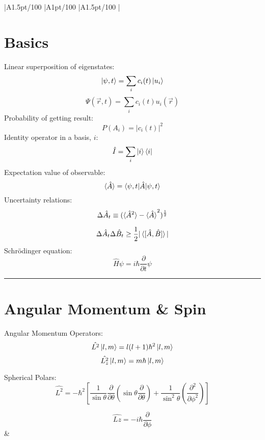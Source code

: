 \documentclass[table,cmyk]{article}
\makeatletter
\newcommand\ratio[2]{\strip@pt\dimexpr#1pt/#2\relax}
\makeatother
\begin{document}
\begin{longtable}
{
    |A{1.5}{\ratio{30}{100}}%
    |A{1}{\ratio{30}{100}}%
    |A{1.5}{\ratio{30}{100}}%
    |%
}\hline
\section*{Basics}
Linear superposition of eigenstates:
\[
\ket{\psi,t} = \sum_{i} c_i(t)\ket{u_i}
\]
\[
\Psi(\vec{r},t) = \sum_{i} c_i(t)u_i(\vec{r})
\]
Probability of getting result:
\[
P(A_i) = |c_i(t)|^2\]
Identity operator in a basis, $i$:
  \[
  \hat I=\sum_{i}\ket{i}\bra{i}
  \]  
Expectation value of observable:
\[\braket{\hat{A}} = \braket{\psi, t|\hat{A}|\psi, t}\]
Uncertainty relations:
\[\Delta\hat{A}_t \equiv (\braket{\hat{A}^2} - \braket{\hat{A}}^2)^{\frac{1}{2}}\]

\[\Delta\hat{A}_t\Delta\hat{B}_t \ge \frac{1}{2} |\braket{[ \hat{A},\hat{B} ]}|\]
Schr\"odinger equation:
  \[
  \hat H\psi = i \hbar \frac{\partial}{\partial t} \psi
  \]


\noindent\rule{7.8cm}{0.4pt}
\section*{Angular Momentum \& Spin}
Angular Momentum Operators:
\[
\hat{L^2}\ket{l,m} = l(l+1)\hbar^2\ket{l,m}
\]
\[\hat{L^2_z} \ket{l,m} = m\hbar\ket{l,m}\]

Spherical Polars:
\[ \hat{L^2} = -\hbar^2\left[\frac{1}{\sin{\theta}} \frac{\partial}{\partial\theta}\left(\sin{\theta}\frac{\partial}{\partial\theta}\right)+\frac{1}{\sin^2{\theta}} \left( \frac{\partial^2}{\partial\phi^2}\right) \right] \]

\[ \hat{Lz} = -i\hbar\frac{\partial}{\partial\phi}\]
&
\vspace{0.3cm}


\end{longtable}
\end{document}
